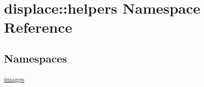 \hypertarget{namespacedisplace_1_1helpers}{}\section{displace\+::helpers Namespace Reference}
\label{namespacedisplace_1_1helpers}
\subsection*{Namespaces}
\begin{DoxyCompactItemize}
\item 
 \mbox{\hyperlink{namespacedisplace_1_1helpers_1_1images}{images}}
\end{DoxyCompactItemize}
